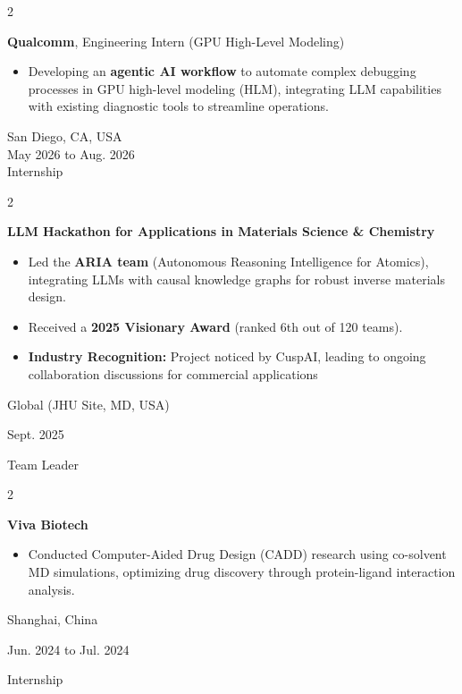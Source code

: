 \documentclass[10pt, letterpaper]{article}
\newenvironment{highlights}{
    \begin{itemize}[
        topsep=0.10 cm,
        parsep=0.10 cm,
        partopsep=0pt,
        itemsep=0pt,
        leftmargin=0.4 cm + 10pt
    ]
}{
    \end{itemize}
} %
\newenvironment{twocolentry}[2][]{
    \onecolentry
    \def\secondColumn{#2}
    \setcolumnwidth{\fill, 4.5 cm}
    \begin{paracol}{2}
}{
    \switchcolumn \raggedleft \secondColumn
    \end{paracol}
    \endonecolentry
} %
\let\hrefWithoutArrow\href
\renewcommand{\href}[2]{\hrefWithoutArrow{#1}{\mbox{\ifthenelse{\equal{#2}{}}{ }{#2 }\raisebox{.15ex}{\footnotesize \faExternalLink*}}}}
\begin{document}
\begin{twocolentry}{
    San Diego, CA, USA \\
    May 2026 to Aug. 2026 \\
    Internship
}
\textbf{Qualcomm},  Engineering Intern (GPU High-Level Modeling)
\begin{highlights}
    \item Developing an \textbf{agentic AI workflow} to automate complex debugging processes in GPU high-level modeling (HLM), integrating LLM capabilities with existing diagnostic tools to streamline operations.
\end{highlights}
\end{twocolentry}

\begin{twocolentry}{
Global (JHU Site, MD, USA)

Sept. 2025

Team Leader

}
\textbf{LLM Hackathon for Applications in Materials Science \& Chemistry}
\quad \href{https://llmhackathon.github.io/awards/}{\faGlobe}
\begin{highlights}
\item Led the \textbf{ARIA team} (Autonomous Reasoning Intelligence for Atomics), integrating LLMs with causal knowledge graphs for robust inverse materials design.
\item Received a \textbf{2025 Visionary Award} (ranked 6th out of 120 teams).
\item \textbf{Industry Recognition:} Project noticed by CuspAI, leading to ongoing collaboration discussions for commercial applications
\end{highlights}
\end{twocolentry}


\begin{twocolentry}{
    Shanghai, China

    Jun. 2024 to Jul. 2024

    Internship
}
    \textbf{Viva Biotech}
    \begin{highlights}
        \item Conducted Computer-Aided Drug Design (CADD) research using co-solvent MD simulations, optimizing drug discovery through protein-ligand interaction analysis.
    \end{highlights}
\end{twocolentry}
\end{document}

